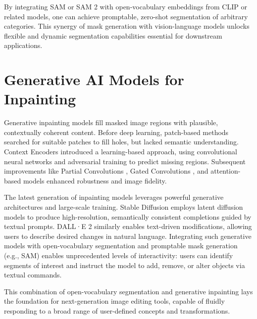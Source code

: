 By integrating SAM or SAM 2 with open-vocabulary embeddings from CLIP or related models, one can achieve promptable, zero-shot segmentation of arbitrary categories. This synergy of mask generation with vision-language models unlocks flexible and dynamic segmentation capabilities essential for downstream applications.

\section{Generative AI Models for Inpainting}
Generative inpainting models fill masked image regions with plausible, contextually coherent content. Before deep learning, patch-based methods \cite{criminisi2004region} searched for suitable patches to fill holes, but lacked semantic understanding. Context Encoders \cite{pathak2016context} introduced a learning-based approach, using convolutional neural networks and adversarial training to predict missing regions. Subsequent improvements like Partial Convolutions \cite{liu2018image}, Gated Convolutions \cite{yu2019free}, and attention-based models \cite{yu2018generative} enhanced robustness and image fidelity.

The latest generation of inpainting models leverages powerful generative architectures and large-scale training. Stable Diffusion \cite{rombach2022high} employs latent diffusion models to produce high-resolution, semantically consistent completions guided by textual prompts. DALL·E 2 \cite{ramesh2022hierarchical} similarly enables text-driven modifications, allowing users to describe desired changes in natural language. Integrating such generative models with open-vocabulary segmentation and promptable mask generation (e.g., SAM) enables unprecedented levels of interactivity: users can identify segments of interest and instruct the model to add, remove, or alter objects via textual commands.

This combination of open-vocabulary segmentation and generative inpainting lays the foundation for next-generation image editing tools, capable of fluidly responding to a broad range of user-defined concepts and transformations.
